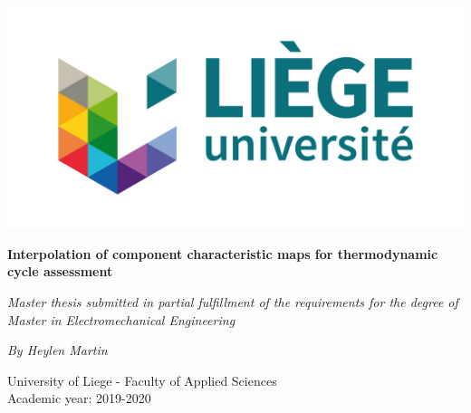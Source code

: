 \documentclass[12pt,a4paper]{report}
\begin{document}
\begin{titlepage}

\centering
\includegraphics{logo_ulg.jpg}%

\vspace*{1cm}
\hrulefill
\begin{center}\bfseries\Huge
Interpolation of component characteristic maps for thermodynamic cycle assessment
\end{center}
\hrulefill
\vspace*{0.2cm}
\begin{center}\Large
\textit{Master thesis submitted in partial fulfillment of the requirements
for the degree of Master in Electromechanical Engineering}
\end{center}
\begin{center}\Large
\textit{By Heylen Martin}
\end{center}
\vspace*{0.2cm}

\begin{center}\bfseries\large

University of Liege - Faculty of Applied Sciences \\
Academic year: 2019-2020
\end{center}
\begin{flushright}

\end{flushright} 

\end{titlepage}


\pagestyle{empty}
\tableofcontents
\listoffigures
\listoftables
\newpage
\end{document}
